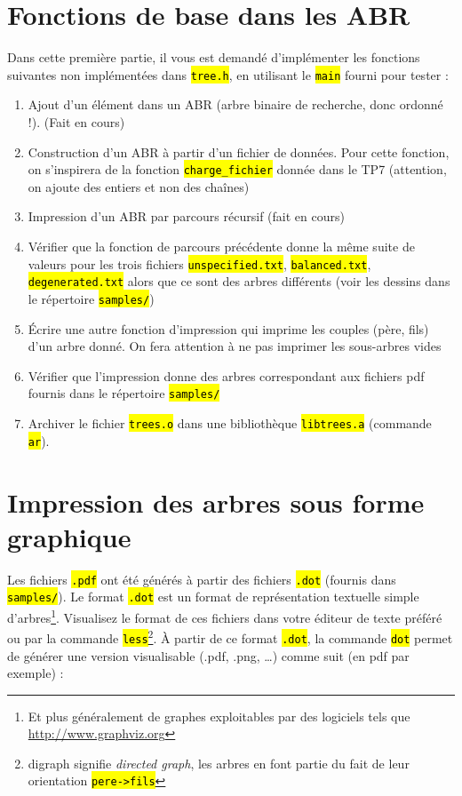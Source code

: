 \documentclass[final, pdftex, a4paper, openbib, ]{article}
\let\OldTexttt\texttt
\renewcommand{\texttt}[1]{\OldTexttt{\hl{#1}}}
\begin{document}

\section{Fonctions de base dans les ABR}
Dans cette première partie, il vous est demandé d'implémenter les fonctions suivantes non implémentées dans \texttt{tree.h}, en utilisant le \texttt{main} fourni pour tester :

\begin{enumerate}
	\item Ajout d'un élément dans un ABR (arbre binaire de recherche, donc ordonné !). (Fait en cours)
	\item Construction d'un ABR à partir d'un fichier de données. Pour cette fonction, on s'inspirera de la fonction \texttt{charge\_fichier} donnée dans le TP7 (attention, on ajoute des entiers et non des chaînes)
	\item Impression d'un ABR par parcours récursif (fait en cours)
	\item Vérifier que la fonction de parcours précédente donne la même suite de valeurs pour les trois fichiers \texttt{unspecified.txt}, \texttt{balanced.txt}, \texttt{degenerated.txt} alors que ce sont des arbres différents (voir les dessins dans le répertoire \texttt{samples/})
	\item Écrire une autre fonction d'impression qui imprime les couples (père, fils) d'un arbre donné. On fera attention à ne pas imprimer les sous-arbres vides
	\item Vérifier que l'impression donne des arbres correspondant aux fichiers pdf fournis dans le répertoire \texttt{samples/}
	\item Archiver le fichier \texttt{trees.o} dans une bibliothèque \texttt{libtrees.a} (commande \texttt{ar}).
\end{enumerate}


\section{ Impression des arbres sous forme graphique}
Les fichiers \texttt{.pdf} ont été générés à partir des fichiers \texttt{.dot} (fournis dans \texttt{samples/}).
Le format \texttt{.dot} est un format de représentation textuelle simple d'arbres\footnote{Et plus généralement de graphes exploitables par des logiciels tels que \url{http://www.graphviz.org}}.
Visualisez le format de ces fichiers dans votre éditeur de texte préféré ou par la commande \texttt{less}\footnote{digraph signifie \textit{directed graph}, les arbres en font partie du fait de leur orientation \texttt{pere->fils}}.
À partir de ce format \texttt{.dot}, la commande \texttt{dot} permet de générer une version visualisable (.pdf, .png, \ldots) comme suit (en pdf par exemple) :
\end{document}
